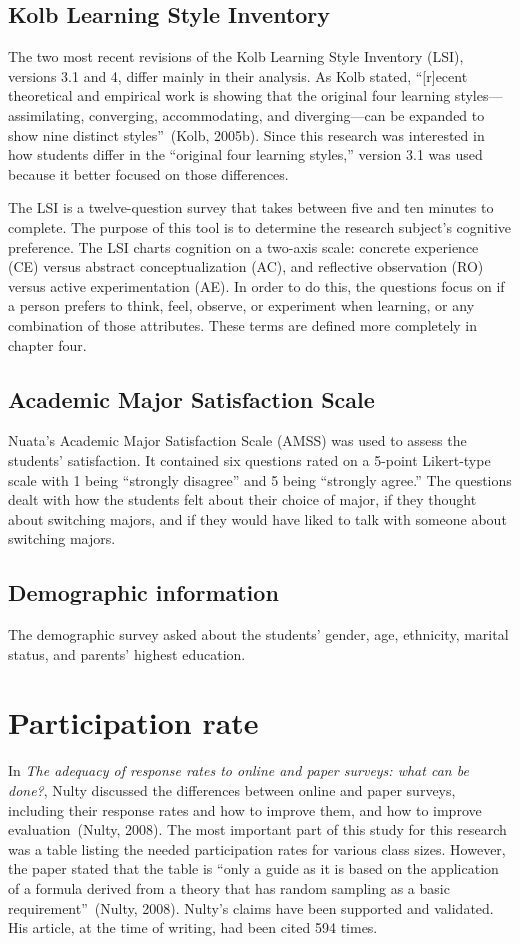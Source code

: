 \subsection{Kolb Learning Style Inventory}
The two most recent revisions of the Kolb Learning Style Inventory (LSI), versions 3.1 and 4, differ mainly in their analysis. As Kolb stated, ``[r]ecent theoretical and empirical work is showing that the original four learning styles—assimilating, converging, accommodating, and diverging—can be expanded to show nine distinct styles''~(Kolb, 2005b). Since this research was interested in how students differ in the ``original four learning styles,'' version 3.1 was used because it better focused on those differences.

The LSI is a twelve-question survey that takes between five and ten minutes to complete. The purpose of this tool is to determine the research subject's cognitive preference. The LSI charts cognition on a two-axis scale: concrete experience (CE) versus abstract conceptualization (AC), and reflective observation (RO) versus active experimentation (AE). In order to do this, the questions focus on if a person prefers to think, feel, observe, or experiment when learning, or any combination of those attributes. These terms are defined more completely in chapter four.

\subsection{Academic Major Satisfaction Scale}
Nuata's Academic Major Satisfaction Scale (AMSS) was used to assess the students' satisfaction. It contained six questions rated on a 5-point Likert-type scale with 1 being ``strongly disagree'' and 5 being ``strongly agree.'' The questions dealt with how the students felt about their choice of major, if they thought about switching majors, and if they would have liked to talk with someone about switching majors.

\subsection{Demographic information}
The demographic survey asked about the students' gender, age, ethnicity, marital status, and parents' highest education.

\section{Participation rate}
In \textit{The adequacy of response rates to online and paper surveys: what can be done?}, Nulty discussed the differences between online and paper surveys, including their response rates and how to improve them, and how to improve evaluation~(Nulty, 2008). The most important part of this study for this research was a table listing the needed participation rates for various class sizes. However, the paper stated that the table is ``only a guide as it is based on the application of a formula derived from a theory that has random sampling as a basic requirement''~(Nulty, 2008). Nulty's claims have been supported and validated. His article, at the time of writing, had been cited 594 times.

